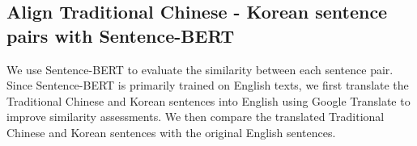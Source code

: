 \documentclass[PhD]{PHlab-thesis}
\begin{document}
 
 
 
 

\subsection{Align Traditional Chinese - Korean sentence pairs with Sentence-BERT}
We use Sentence-BERT to evaluate the similarity between each sentence pair. Since Sentence-BERT is primarily trained on English texts, we first translate the Traditional Chinese and Korean sentences into English using Google Translate to improve similarity assessments. We then compare the translated Traditional Chinese and Korean sentences with the original English sentences.
\end{document}
